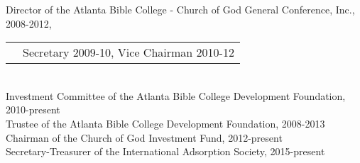 Director of the Atlanta Bible College - Church of God General Conference, Inc., 2008-2012,\\
\begin{tabular}{l l} & Secretary 2009-10, Vice Chairman 2010-12 \end{tabular}\\
Investment Committee of the Atlanta Bible College Development Foundation, 2010-present\\
Trustee of the Atlanta Bible College Development Foundation, 2008-2013\\
Chairman of the Church of God Investment Fund, 2012-present\\
Secretary-Treasurer of the International Adsorption Society, 2015-present

